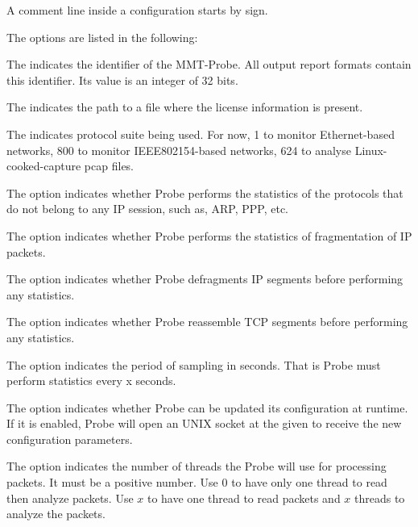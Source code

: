 A comment line inside a configuration starts by \inlineCode{\#} sign.

The options are listed in the following:

The  indicates the identifier of the MMT-Probe. All output report formats contain this identifier. Its value is an integer of 32 bits.

The  indicates the path to a file where the license information is present.

The  indicates protocol suite being used. For now, 1 to monitor Ethernet-based networks, 800 to monitor IEEE802154-based networks, 624 to analyse Linux-cooked-capture pcap files.

The option indicates whether Probe performs the statistics of the protocols that do not belong to any IP session, such as, ARP, PPP, etc.

The option indicates whether Probe performs the statistics of fragmentation of IP packets.

The option indicates whether Probe defragments IP segments before performing any statistics. 

The option indicates whether Probe reassemble TCP segments before performing any statistics.

The option indicates the period of sampling in seconds. That is Probe must perform statistics every x seconds. 

The option indicates whether Probe can be updated its configuration at runtime. If it is enabled, Probe will open an UNIX socket at the given  to receive the new configuration parameters.



The option indicates the number of threads the Probe will use for processing packets. It must be a positive number.
Use $0$ to have only one thread to read then analyze packets. Use $x$ to have one thread to read packets and $x$ threads to analyze the packets. 

